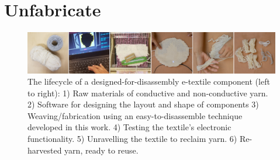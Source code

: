 \chapter{Unfabricate}
\label{ch_unfabricate}


\begin{figure}
	\includegraphics[width=\linewidth]{figs/UF_teaser.png}
	\caption[The lifecycle of a designed-for-disassembly e-textile component.]{
        The lifecycle of a designed-for-disassembly e-textile component (left to right): 1) Raw materials of conductive and non-conductive yarn. 2) Software for designing the layout and shape of components 3) Weaving/fabrication using an easy-to-disassemble technique developed in this work. 4) Testing the textile's electronic functionality. 5) Unravelling the textile to reclaim yarn. 6) Re-harvested yarn, ready to reuse.
    }
    \label{fig:teaser}

\end{figure}


